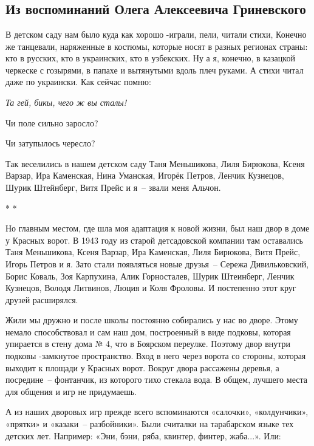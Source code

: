 \chapter{}

\section*{Из воспоминаний Олега Алексеевича Гриневского}

﻿В детском саду нам было куда как хорошо -играли, пели, читали стихи, Конечно же танцевали, наряженные в костюмы, которые носят в разных регионах страны: кто в русских, кто в украинских, кто в узбекских. Ну а я, конечно, в казацкой черкеске с гозырями, в папахе и вытянутыми вдоль плеч руками. А стихи читал даже по украински. Как сейчас помню: 

\indent

{\itshape
Та гей, бикы, чего ж вы сталы! 

Чи поле сильно заросло? 

Чи затупылось чересло?
}

\indent

Так  веселились  в  нашем  детском   саду  Таня  Меньшикова,   Лиля Бирюкова, Ксеня Варзар, Ира Каменская, Нина Уманская, Игорёк Петров, Ленчик Кузнецов, Шурик Штейнберг, Витя Прейс и я~-- звали меня Альчон. 

\indent

{\center * * *}

\indent

Но главным местом, где шла моя адаптация к новой жизни, был наш двор в доме у Красных ворот. В 1943 году из старой детсадовской компании там оставались Таня Меньшикова, Ксеня Варзар, Ира Каменская, Лиля Бирюкова, Витя Прейс, Игорь Петров и я. Зато стали появляться новые друзья~-- Сережа Дивильковский, Борис Коваль, Зоя Карпухина, Алик Горносталев, Шурик Штеинберг, Ленчик Кузнецов, Володя Литвинов, Люция и Коля Фроловы. И постепенно этот круг друзей расширялся.

Жили мы дружно и после школы постоянно собирались у нас во дворе. Этому немало способствовал и сам наш дом, построенный в виде подковы, которая упирается в стену дома № 4, что в Боярском переулке. Поэтому двор внутри подковы -замкнутое пространство. Вход в него через ворота со стороны, которая выходит к площади у Красных ворот. Вокруг двора рассажены деревья, а посредине~-- фонтанчик, из которого тихо стекала вода. В общем, лучшего места для общения и игр не придумаешь.

А из наших дворовых игр прежде всего вспоминаются «салочки», «колдунчики», «прятки» и «казаки~-- разбойники». Были считалки на тарабарском языке тех детских лет. Например: «Эни, бэни, ряба, квинтер, финтер, жаба...». Или:

